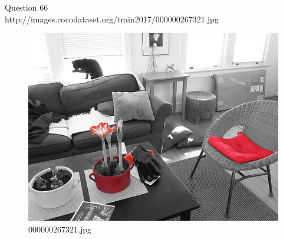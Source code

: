 Question 66\\
http://images.cocodataset.org/train2017/000000267321.jpg
\begin{figure}[h]
    \centering
    \includegraphics[width=0.8\linewidth]{../image set/hard/000000267321.jpg}
    \caption{000000267321.jpg}
\end{figure}
